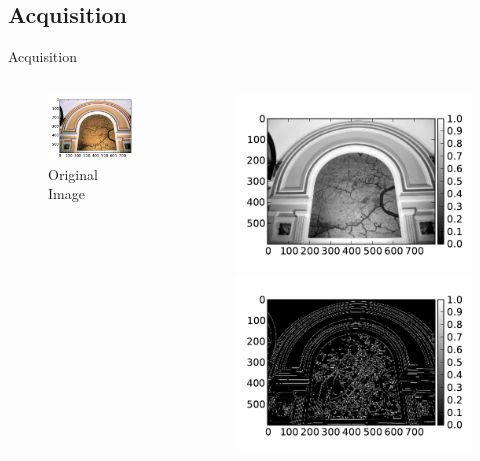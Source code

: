 \documentclass[mathserif]{beamer}
\begin{document}
\subsection{Acquisition}
\begin{frame}{Acquisition}
    \begin{columns}[T]
        \begin{column}{0.4\textwidth}
            \begin{figure}
                \includegraphics[width=\textwidth]{illustrations/input_example_color}
                \caption{Original Image}
            \end{figure}
        \end{column}
        \begin{column}{0.6\textwidth}
                \begin{figure}
                    \includegraphics[width=.5\textwidth]{illustrations/input_example_luma}
                    \includegraphics[width=.5\textwidth]{illustrations/input_example_canny}\\

\end{figure}
\end{column}
\end{columns}
\end{frame}
\end{document}
